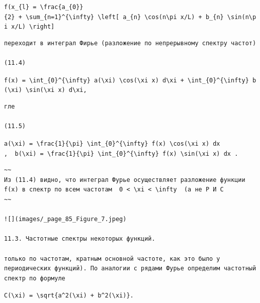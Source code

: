 \documentclass[
  ukrainian,
]{article}
\begin{document}
\texttt{f(x\_\{l\}\ =\ \textbackslash{}frac\{a\_\{0\}\}\{2\}\ +\ \textbackslash{}sum\_\{n=1\}\^{}\{\textbackslash{}infty\}\ \textbackslash{}left{[}\ a\_\{n\}\ \textbackslash{}cos(n\textbackslash{}pi\ x/L)\ +\ b\_\{n\}\ \textbackslash{}sin(n\textbackslash{}pi\ x/L)\ \textbackslash{}right{]}}

\begin{verbatim}
переходит в интеграл Фирье (разложение по непрерывному спектру частот)

(11.4)
\end{verbatim}

\texttt{f(x)\ =\ \textbackslash{}int\_\{0\}\^{}\{\textbackslash{}infty\}\ a(\textbackslash{}xi)\ \textbackslash{}cos(\textbackslash{}xi\ x)\ d\textbackslash{}xi\ +\ \textbackslash{}int\_\{0\}\^{}\{\textbackslash{}infty\}\ b(\textbackslash{}xi)\ \textbackslash{}sin(\textbackslash{}xi\ x)\ d\textbackslash{}xi,}

\begin{verbatim}
гле

(11.5)
\end{verbatim}

\texttt{a(\textbackslash{}xi)\ =\ \textbackslash{}frac\{1\}\{\textbackslash{}pi\}\ \textbackslash{}int\_\{0\}\^{}\{\textbackslash{}infty\}\ f(x)\ \textbackslash{}cos(\textbackslash{}xi\ x)\ dx}
\texttt{,\ \ b(\textbackslash{}xi)\ =\ \textbackslash{}frac\{1\}\{\textbackslash{}pi\}\ \textbackslash{}int\_\{0\}\^{}\{\textbackslash{}infty\}\ f(x)\ \textbackslash{}sin(\textbackslash{}xi\ x)\ dx\ .}

\begin{verbatim}
~~
Из (11.4) видно, что интеграл Фурье осуществляет разложение функции f(x) в спектр по всем частотам  0 < \xi < \infty  (а не Р И С
~~

![](images/_page_85_Figure_7.jpeg)

11.3. Частотные спектры некоторых функций.

только по частотам, кратным основной частоте, как это было у периодических функций). По аналогии с рядами Фурье определим частотный спектр по формуле
\end{verbatim}

\texttt{C(\textbackslash{}xi)\ =\ \textbackslash{}sqrt\{a\^{}2(\textbackslash{}xi)\ +\ b\^{}2(\textbackslash{}xi)\}.}
\end{document}
